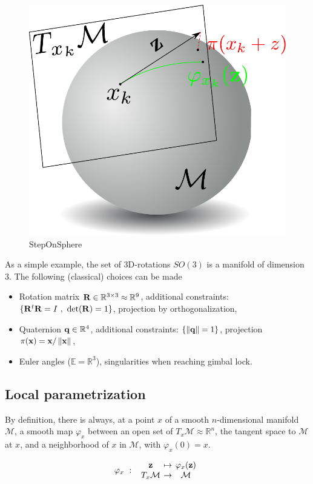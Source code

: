 \begin{figure}[htpb]
  \centering
  \includegraphics[width=0.5\linewidth]{Humanoids2015/stepOnSphere.pdf}
  \caption{StepOnSphere}
\label{fig:stepOnSphere}
\end{figure}

As a simple example, the set of 3D-rotations $SO(3)$ is a manifold of dimension $3$.
The following (classical) choices can be made
\begin{itemize}
  \item Rotation matrix ${\bf R} \in \mathbb{R}^{3\times 3} \approx \mathbb{R}^9$, additional constraints: $\{{\bf R}^t{\bf R} = I\ ,\ \det({\bf R})=1\}$, projection by orthogonalization,
  \item Quaternion ${\bf q} \in \mathbb{R}^4$, additional constraints: $\{ \left\|{\bf q}\right\|=1\}$, projection $\pi({\bf x}) = {\bf x}/\left\|{\bf x}\right\|$,
  \item Euler angles ($\mathbb{E} = \mathbb{R}^3$), singularities when reaching gimbal lock.
\end{itemize}

\subsection{Local parametrization}
By definition, there is always, at a point $x$ of a smooth $n$-dimensional manifold $\mathcal{M}$, a smooth map $\varphi_x$ between an open set of $T_x\mathcal{M}\approx \mathbb{R}^n$, the tangent space to $\mathcal{M}$ at $x$, and a neighborhood of $x$ in $\mathcal{M}$, with $\varphi_x(0) = x$.

\begin{equation}
  \varphi_x\ :\
  \begin{array}{ccc}
    \mathbf{z} & \reduce{\mapsto}{6} & \varphi_x(\mathbf{z}) \\
    T_x\mathcal{M} & \reduce{\rightarrow}{6} & \mathcal{M}
  \end{array} \nonumber%
\end{equation}

